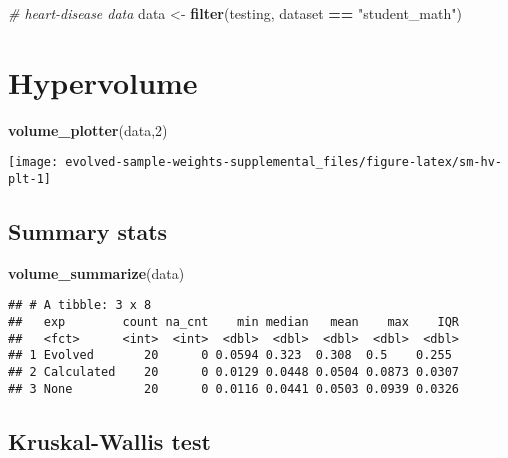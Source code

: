 \documentclass[
]{book}
\newenvironment{Shaded}{\begin{snugshade}}{\end{snugshade}}
\newcommand{\CommentTok}[1]{\textcolor[rgb]{0.56,0.35,0.01}{\textit{#1}}}
\newcommand{\DecValTok}[1]{\textcolor[rgb]{0.00,0.00,0.81}{#1}}
\newcommand{\FunctionTok}[1]{\textcolor[rgb]{0.13,0.29,0.53}{\textbf{#1}}}
\newcommand{\NormalTok}[1]{#1}
\newcommand{\OtherTok}[1]{\textcolor[rgb]{0.56,0.35,0.01}{#1}}
\newcommand{\SpecialCharTok}[1]{\textcolor[rgb]{0.81,0.36,0.00}{\textbf{#1}}}
\newcommand{\StringTok}[1]{\textcolor[rgb]{0.31,0.60,0.02}{#1}}
\begin{document}
\begin{Shaded}
\begin{Highlighting}[]
\CommentTok{\# heart{-}disease data}
\NormalTok{data }\OtherTok{\textless{}{-}} \FunctionTok{filter}\NormalTok{(testing, dataset }\SpecialCharTok{==} \StringTok{"student\_math"}\NormalTok{)}
\end{Highlighting}
\end{Shaded}

\hypertarget{hypervolume-1}{%
\section{Hypervolume}\label{hypervolume-1}}

\begin{Shaded}
\begin{Highlighting}[]
\FunctionTok{volume\_plotter}\NormalTok{(data,}\DecValTok{2}\NormalTok{)}
\end{Highlighting}
\end{Shaded}

\texttt{[image: evolved-sample-weights-supplemental\_files/figure-latex/sm-hv-plt-1]}

\hypertarget{summary-stats-1}{%
\subsection{Summary stats}\label{summary-stats-1}}

\begin{Shaded}
\begin{Highlighting}[]
\FunctionTok{volume\_summarize}\NormalTok{(data)}
\end{Highlighting}
\end{Shaded}

\begin{verbatim}
## # A tibble: 3 x 8
##   exp        count na_cnt    min median   mean    max    IQR
##   <fct>      <int>  <int>  <dbl>  <dbl>  <dbl>  <dbl>  <dbl>
## 1 Evolved       20      0 0.0594 0.323  0.308  0.5    0.255 
## 2 Calculated    20      0 0.0129 0.0448 0.0504 0.0873 0.0307
## 3 None          20      0 0.0116 0.0441 0.0503 0.0939 0.0326
\end{verbatim}

\hypertarget{kruskal-wallis-test-1}{%
\subsection{Kruskal-Wallis test}\label{kruskal-wallis-test-1}}
\end{document}
